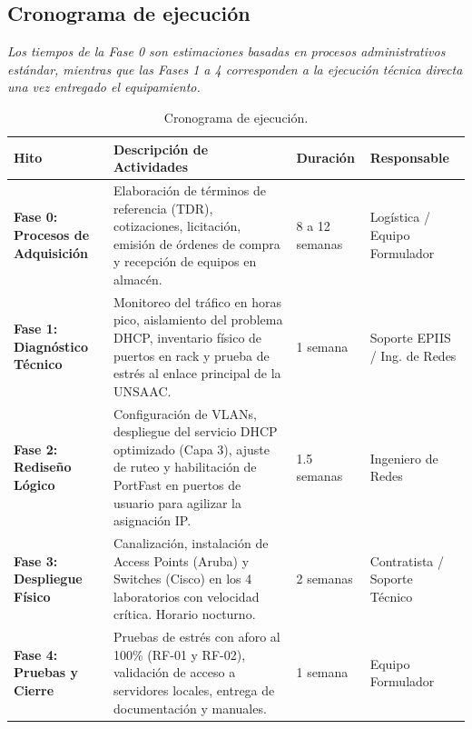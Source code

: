\subsection{Cronograma de ejecución}

	\textit{Los tiempos de la Fase 0 son estimaciones basadas en procesos administrativos estándar, mientras que las Fases 1 a 4 corresponden a la ejecución técnica directa una vez entregado el equipamiento.}

	\begin{table}[H]
		\centering
		\caption{Cronograma de ejecución.}
		\begin{tabular}{T{3cm}T{6.4cm}C{1.6cm}T{2.8cm}}
			\hline
			\textbf{Hito} & \textbf{Descripción de Actividades} & \textbf{Duración} & \textbf{Responsable} \bigstrut\\
			\hline
			\textbf{Fase 0: Procesos de Adquisición} & Elaboración de términos de referencia (TDR), cotizaciones, licitación, emisión de órdenes de compra y recepción de equipos en almacén. & 8 a 12 semanas & Logística / Equipo Formulador \\
			\textbf{Fase 1: Diagnóstico Técnico} & Monitoreo del tráfico en horas pico, aislamiento del problema DHCP, inventario físico de puertos en rack y prueba de estrés al enlace principal de la UNSAAC. & 1 semana & Soporte EPIIS / Ing. de Redes \\
			\textbf{Fase 2: Rediseño Lógico} & Configuración de VLANs, despliegue del servicio DHCP optimizado (Capa 3), ajuste de ruteo y habilitación de PortFast en puertos de usuario para agilizar la asignación IP. & 1.5 semanas & Ingeniero de Redes \\
			\textbf{Fase 3: Despliegue Físico} & Canalización, instalación de Access Points (Aruba) y Switches (Cisco) en los 4 laboratorios con velocidad crítica. Horario nocturno. & 2 semanas & Contratista / Soporte Técnico \\
			\textbf{Fase 4: Pruebas y Cierre} & Pruebas de estrés con aforo al 100\% (RF-01 y RF-02), validación de acceso a servidores locales, entrega de documentación y manuales. & 1 semana & Equipo Formulador \\
			\hline
		\end{tabular}
		\label{tab:cronograma}
	\end{table}
